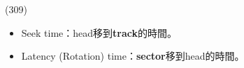 \begin{theorem}{(309)} \quad\quad \begin{itemize}
        \item Seek time：head移到\textbf{track}的時間。
        \item Latency (Rotation) time：\textbf{sector}移到head的時間。
    \end{itemize}
\end{theorem}